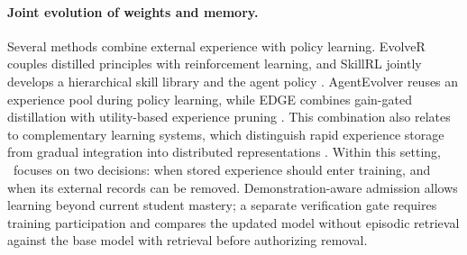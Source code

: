 \paragraph{Joint evolution of weights and memory.}
Several methods combine external experience with policy learning. EvolveR couples distilled principles with reinforcement learning, and SkillRL jointly develops a hierarchical skill library and the agent policy \citep{evolver2025,skillrl2026}. AgentEvolver reuses an experience pool during policy learning, while EDGE combines gain-gated distillation with utility-based experience pruning \citep{agentevolver2025,xie2026edge}. This combination also relates to complementary learning systems, which distinguish rapid experience storage from gradual integration into distributed representations \citep{mcclelland1995cls}. Within this setting, \method\ focuses on two decisions: when stored experience should enter training, and when its external records can be removed. Demonstration-aware admission allows learning beyond current student mastery; a separate verification gate requires training participation and compares the updated model without episodic retrieval against the base model with retrieval before authorizing removal.
